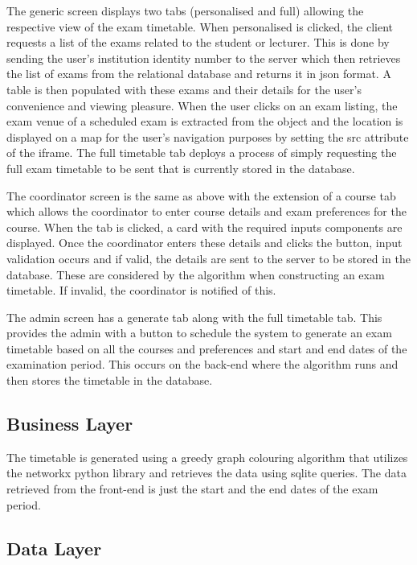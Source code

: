 \documentclass{article}
\begin{document}
The generic screen displays two tabs (personalised and full) allowing the respective view of the exam timetable. When personalised is clicked, the client requests a list of the exams related to the student or lecturer. This is done by sending the user’s institution identity number to the server which then retrieves the list of exams from the relational database and returns it in json format. A table is then populated with these exams and their details for the user’s convenience and viewing pleasure. When the user clicks on an exam listing, the exam venue of a scheduled exam is extracted from the object and the location is displayed on a map for the user’s navigation purposes by setting the src attribute of the iframe. The full timetable tab deploys a process of simply requesting the full exam timetable to be sent that is currently stored in the database.

The coordinator screen is the same as above with the extension of a course tab which allows the coordinator to enter course details and exam preferences for the course. When the tab is clicked, a card with the required inputs components are displayed. Once the coordinator enters these details and clicks the button, input validation occurs and if valid, the details are sent to the server to be stored in the database. These are considered by the algorithm when constructing an exam timetable. If invalid, the coordinator is notified of this.

The admin screen has a generate tab along with the full timetable tab. This provides the admin with a button to schedule the system to generate an exam timetable based on all the courses and preferences and start and end dates of the examination period. This occurs on the back-end where the algorithm runs and then stores the timetable in the database.

\subsection{Business Layer}

The timetable is generated using a greedy graph colouring algorithm that utilizes the networkx python library and retrieves the data using sqlite queries. The data retrieved from the front-end is just the start and the end dates of the exam period. 


\subsection{Data Layer}
\end{document}
